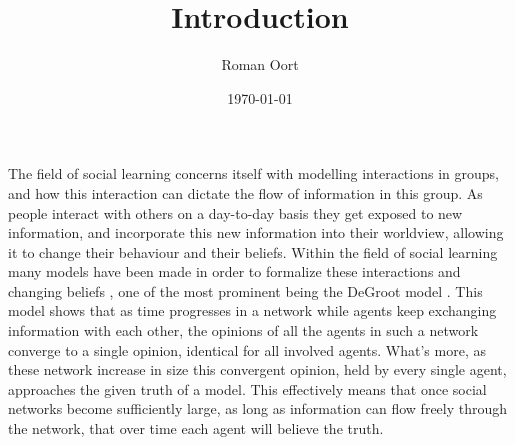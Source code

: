 \documentclass{article}
\title{Introduction}
\author{Roman Oort}
\date{\today}
\begin{document}
\maketitle

The field of social learning concerns itself with modelling interactions in groups, and how this interaction can dictate the flow of information in this group. As people interact with others on a day-to-day basis they get exposed to new information, and incorporate this new information into their worldview, allowing it to change their behaviour and their beliefs. Within the field of social learning many models have been made in order to formalize these interactions and changing beliefs \cite{golub2017learning}, one of the most prominent being the DeGroot model \cite{degroot1974concensus}.
This model shows that as time progresses in a network while agents keep exchanging information with each other, the opinions of all the agents in such a network converge to a single opinion, identical for all involved agents. What's more, as these network increase in size this convergent opinion, held by every single agent, approaches the given truth of a model. This effectively means that once social networks become sufficiently large, as long as information can flow freely through the network, that over time each agent will believe the truth.



\end{document}
